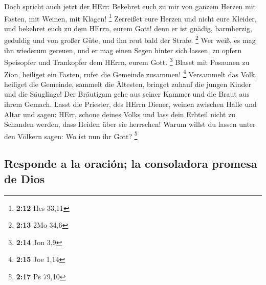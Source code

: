  Doch spricht auch jetzt der HErr: Bekehret euch zu mir
von ganzem Herzen mit Fasten, mit Weinen, mit Klagen! \footnote{\textbf{2:12}
  Hes 33,11}  Zerreißet eure Herzen und nicht eure
Kleider, und bekehret euch zu dem HErrn, eurem Gott! denn er ist gnädig,
barmherzig, geduldig und von großer Güte, und ihn reut bald der Strafe.
\footnote{\textbf{2:13} 2Mo 34,6}  Wer weiß, es mag ihn
wiederum gereuen, und er mag einen Segen hinter sich lassen, zu opfern
Speisopfer und Trankopfer dem HErrn, eurem Gott. \footnote{\textbf{2:14}
  Jon 3,9}  Blaset mit Posaunen zu Zion, heiliget ein
Fasten, rufet die Gemeinde zusammen! \footnote{\textbf{2:15} Joe 1,14}
 Versammelt das Volk, heiliget die Gemeinde, sammelt die
Ältesten, bringet zuhauf die jungen Kinder und die Säuglinge! Der
Bräutigam gehe aus seiner Kammer und die Braut aus ihrem Gemach.
 Lasst die Priester, des HErrn Diener, weinen zwischen
Halle und Altar und sagen: HErr, schone deines Volks und lass dein
Erbteil nicht zu Schanden werden, dass Heiden über sie herrschen! Warum
willst du lassen unter den Völkern sagen: Wo ist nun ihr Gott?
\footnote{\textbf{2:17} Ps 79,10}

\hypertarget{responde-a-la-oraciuxf3n-la-consoladora-promesa-de-dios}{%
\subsection{Responde a la oración; la consoladora promesa de
Dios}\label{responde-a-la-oraciuxf3n-la-consoladora-promesa-de-dios}}


